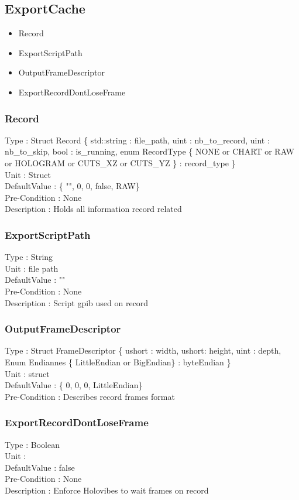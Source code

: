 
\subsection{ExportCache}
\begin{itemize}
    \item Record
    \item ExportScriptPath
    \item OutputFrameDescriptor
    \item ExportRecordDontLoseFrame
\end{itemize}

\subsubsection{Record}
\noindent
Type : Struct Record \{ std::string : file\_path, uint : nb\_to\_record, uint : nb\_to\_skip, bool : is\_running, enum RecordType \{ NONE or CHART or RAW or HOLOGRAM or CUTS\_XZ or CUTS\_YZ \} : record\_type \}\\
Unit : Struct\\
DefaultValue : \{ "", 0, 0, false, RAW\}\\
Pre-Condition : None\\
Description : Holds all information record related\\

\subsubsection{ExportScriptPath}
\noindent
Type : String\\
Unit : file path\\
DefaultValue : ""\\
Pre-Condition : None\\
Description : Script gpib used on record\\

\subsubsection{OutputFrameDescriptor}
\noindent
Type : Struct FrameDescriptor \{ ushort : width, ushort: height, uint : depth, Enum Endiannes \{ LittleEndian or BigEndian\} : byteEndian \}\\
Unit : struct\\
DefaultValue : \{ 0, 0, 0, LittleEndian\}\\
Pre-Condition : Describes record frames format\\

\subsubsection{ExportRecordDontLoseFrame}
\noindent
Type : Boolean\\
Unit : \\
DefaultValue : false\\
Pre-Condition : None\\
Description : Enforce Holovibes to wait frames on record\\
